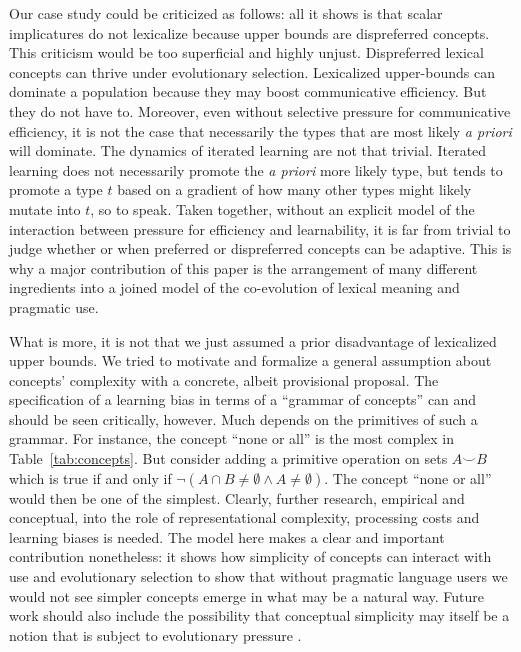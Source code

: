 \documentclass[a4paper, 11pt]{article}
\theoremstyle{Satz}
\begin{document}
Our case study could be criticized as follows: all it shows is that scalar implicatures do not
lexicalize because upper bounds are dispreferred concepts. This criticism would be too
superficial and highly unjust. Dispreferred lexical concepts can thrive under evolutionary
selection. Lexicalized upper-bounds can dominate a population because they may boost
communicative efficiency. But they do not have to. Moreover, even without selective pressure
for communicative efficiency, it is not the case that necessarily the types that are most
likely \emph{a priori} will dominate. The dynamics of iterated learning are not that
trivial. Iterated learning does not necessarily promote the \emph{a priori} more likely type,
but tends to promote a type $t$ based on a gradient of how many other types might likely mutate
into $t$, so to speak. Taken together, without an explicit model of the interaction between
pressure for efficiency and learnability, it is far from trivial to judge whether or when
preferred or dispreferred concepts can be adaptive. This is why a major contribution of this
paper is the arrangement of many different ingredients into a joined model of the co-evolution
of lexical meaning and pragmatic use. 

What is more, it is not that we just assumed a prior disadvantage of lexicalized upper
bounds. We tried to motivate and formalize a general assumption about concepts' complexity
with a concrete, albeit provisional proposal. The specification of a learning bias in terms of
a ``grammar of concepts'' can and should be seen critically, however. Much depends on the
primitives of such a grammar. For instance, the concept ``none or all'' is the most complex in
Table~\ref{tab:concepts}. But consider adding a primitive operation on sets $A \smile B$
which is true if and only if $\neg(A \cap B \neq \emptyset \wedge A \neq \emptyset)$. The
concept ``none or all'' would then be one of the simplest. Clearly, further research, empirical
and conceptual, into the role of representational complexity, processing costs and learning
biases is needed. The model here makes a clear and important contribution nonetheless: it shows
how simplicity of concepts can interact with use and evolutionary selection to show that
without pragmatic language users we would not see simpler concepts emerge in what may be a
natural way. Future work should also include the possibility that conceptual simplicity may
itself be a notion that is subject to evolutionary pressure
\citep[cf.][]{ThompsonKirby2016:Culture-Shapes-}. 
\end{document}
